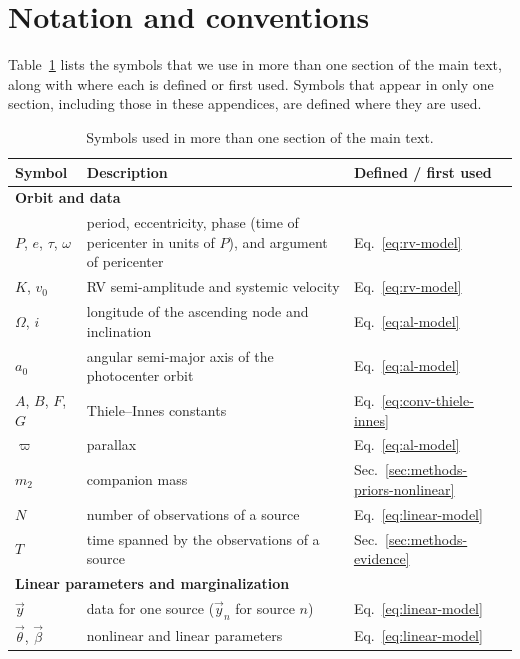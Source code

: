 \documentclass[twocolumn]{AASTeX7/aastex701}
\begin{document}
\appendix

\section{Notation and conventions}
\label{apx:conventions}

Table~\ref{tab:notation} lists the symbols that we use in more than one section of the
main text, along with where each is defined or first used.
Symbols that appear in only one section, including those in these appendices, are
defined where they are used.

\begin{table}
  \centering
  \caption{Symbols used in more than one section of the main text.}
  \label{tab:notation}
  \begin{tabular}{l>{\raggedright\arraybackslash}p{}l}
    \hline
    Symbol & Description & Defined / first used \\
    \hline
    \multicolumn{3}{l}{\textbf{Orbit and data}} \\
    $P$, $e$, $\tau$, $\omega$ & period, eccentricity, phase (time of pericenter in units of
      $P$), and argument of pericenter & Eq.~\ref{eq:rv-model} \\
    $K$, $v_0$ & RV semi-amplitude and systemic velocity & Eq.~\ref{eq:rv-model} \\
    $\Omega$, $i$ & longitude of the ascending node and inclination & Eq.~\ref{eq:al-model} \\
    $a_0$ & angular semi-major axis of the photocenter orbit & Eq.~\ref{eq:al-model} \\
    $A$, $B$, $F$, $G$ & Thiele--Innes constants & Eq.~\ref{eq:conv-thiele-innes} \\
    $\varpi$ & parallax & Eq.~\ref{eq:al-model} \\
    $m_2$ & companion mass & Sec.~\ref{sec:methods-priors-nonlinear} \\
    $N$ & number of observations of a source & Eq.~\ref{eq:linear-model} \\
    $T$ & time spanned by the observations of a source & Sec.~\ref{sec:methods-evidence} \\
    \hline
    \multicolumn{3}{l}{\textbf{Linear parameters and marginalization}} \\
    $\vec{y}$ & data for one source ($\vec{y}_n$ for source $n$) & Eq.~\ref{eq:linear-model} \\
    $\vec{\theta}$, $\vec{\beta}$ & nonlinear and linear parameters & Eq.~\ref{eq:linear-model} \\

\end{tabular}
\end{table}
\end{document}
